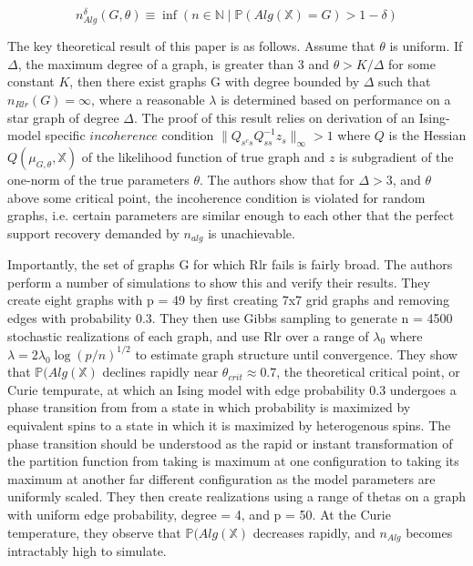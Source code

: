 \documentclass[12pt]{article}
\begin{document}
\[n_{Alg}^\delta(G,\theta) \equiv \inf(n \in \mathbb{N} \mid \mathbb{P}(Alg(\mathbb{X}) = G) > 1-\delta)\]

The key theoretical result of this paper is as follows.  Assume that $\theta$ is uniform.  If $\Delta$, the maximum degree of a graph, is greater than 3 and $\theta > K/\Delta$ for some constant $K$, then there exist graphs G with degree bounded by $\Delta$ such that $n_{Rlr}(G) = \infty$, where a reasonable $\lambda$ is determined based on performance on a star graph of degree $\Delta$.  The proof of this result relies on derivation of an Ising-model specific $incoherence$ condition $\|Q_{s^cs}Q_{ss}^{-1}z_s\|_\infty > 1$ where $Q$ is the Hessian $Q(\mu_{G,\theta},\mathbb{X})$ of the likelihood function of true graph and $z$ is subgradient of the one-norm of the true parameters $\theta$.  The authors show that for $\Delta > 3$, and $\theta$ above some critical point, the incoherence condition is violated for random graphs, i.e. certain parameters are similar enough to each other that the perfect support recovery demanded by $n_{alg}$ is unachievable.

Importantly, the set of graphs G for which Rlr fails is fairly broad. The authors perform a number of simulations to show this and verify their results.  They create eight graphs with p = 49 by first creating 7x7 grid graphs and removing edges with probability 0.3.  They then use Gibbs sampling to generate n = 4500 stochastic realizations of each graph, and use Rlr over a range of $\lambda_0$ where $\lambda = 2\lambda_0\log(p/n)^{1/2}$ to estimate graph structure until convergence.  They show that $\mathbb{P}(Alg(\mathbb{X})$ declines rapidly near $\theta_{crit} \approx 0.7$, the theoretical critical point, or Curie tempurate, at which an Ising model with edge probability 0.3 undergoes a phase transition from from a state in which probability is maximized by equivalent spins to a state in which it is maximized by heterogenous spins.  The phase transition should be understood as the rapid or instant transformation of the partition function from taking is maximum at one configuration to taking its maximum at another far different configuration as the model parameters are uniformly scaled. They then create realizations using a range of thetas on a graph with uniform edge probability, degree = 4, and p = 50.  At the Curie temperature, they observe that $\mathbb{P}(Alg(\mathbb{X})$ decreases rapidly, and $n_{Alg}$ becomes intractably high to simulate.  
\end{document}
